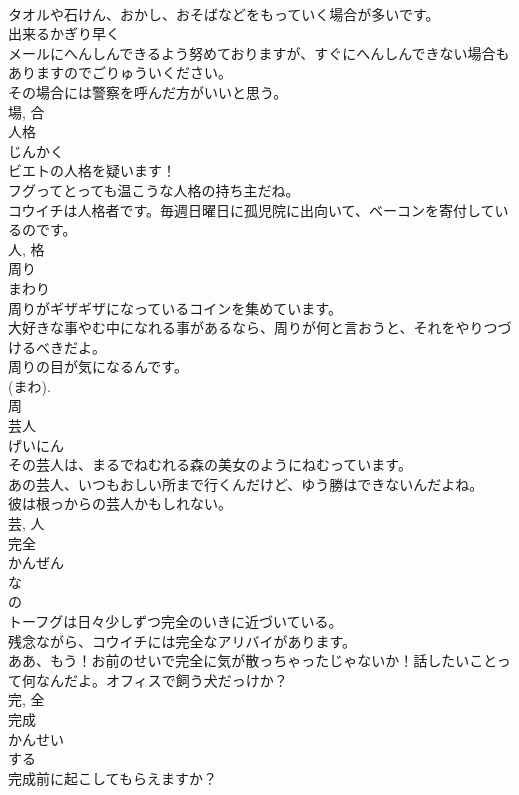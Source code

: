 \documentclass[8pt]{extreport}
\begin{document}
\begin{CJK}{UTF8}{min}
\\	タオルや石けん、おかし、おそばなどをもっていく場合が多いです。	
\\	出来るかぎり早く
\\	メールにへんしんできるよう努めておりますが、すぐにへんしんできない場合もありますのでごりゅういください。	
\\	その場合には警察を呼んだ方がいいと思う。	
\\	場, 合	
\\	人格	
\\	じんかく	
\\	ビエトの人格を疑います！	
\\	フグってとっても温こうな人格の持ち主だね。	
\\	コウイチは人格者です。毎週日曜日に孤児院に出向いて、ベーコンを寄付しているのです。	
\\	人, 格	
\\	周り	
\\	まわり	
\\	周りがギザギザになっているコインを集めています。	
\\	大好きな事やむ中になれる事があるなら、周りが何と言おうと、それをやりつづけるべきだよ。	
\\	周りの目が気になるんです。	
\\	(まわ).
\\	周	
\\	芸人	
\\	げいにん	
\\	その芸人は、まるでねむれる森の美女のようにねむっています。	
\\	あの芸人、いつもおしい所まで行くんだけど、ゆう勝はできないんだよね。	
\\	彼は根っからの芸人かもしれない。	
\\	芸, 人	
\\	完全	
\\	かんぜん	
\\	な 
\\	の 
\\	トーフグは日々少しずつ完全のいきに近づいている。	
\\	残念ながら、コウイチには完全なアリバイがあります。	
\\	ああ、もう！お前のせいで完全に気が散っちゃったじゃないか！話したいことって何なんだよ。オフィスで飼う犬だっけか？	
\\	完, 全	
\\	完成	
\\	かんせい	
\\	する 
\\	完成前に起こしてもらえますか？	

\end{CJK}
\end{document}
